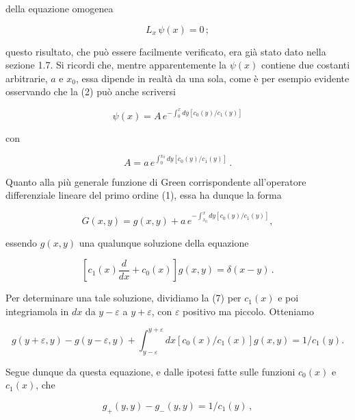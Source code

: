 \documentclass[11pt, a4paper]{book}
\numberwithin{equation}{section}
\begin{document}
della equazione omogenea

\begin{equation}
    L_x \, \psi(x) = 0 \,;
\end{equation}

questo risultato, che può essere facilmente verificato, era già stato dato nella sezione 1.7. Si ricordi che, mentre apparentemente la $\psi(x)$ contiene due costanti arbitrarie, $a$ e $x_0$, essa dipende in realtà da una sola, come è per esempio evidente osservando che la (2) può anche scriversi

\begin{equation}
    \psi(x) = A \, e^{\displaystyle -\int_0^x dy \left[ c_0(y)/c_1(y) \right]}
\end{equation}

con

\begin{equation}
    A = a \, e^{\displaystyle \int_0^{x_0} dy \left[ c_0(y)/c_1(y) \right]} \,.
\end{equation}

Quanto alla più generale funzione di Green corrispondente all'operatore differenziale lineare del primo ordine (1), essa ha dunque la forma

\begin{equation}
    G(x,y) = g(x,y) + a \, e^{\displaystyle -\int_{x_0}^{x} dy \left[ c_0(y)/c_1(y) \right]},
\end{equation}

essendo $g(x,y)$ una qualunque soluzione della equazione

\begin{equation}
    \left[ c_1(x) \frac{d}{dx} + c_0(x) \right] g(x,y) = \delta(x-y) \,.
\end{equation}

Per determinare una tale soluzione, dividiamo la (7) per $c_1(x)$ e poi integriamola in $dx$ da $y-\varepsilon$ a $y+\varepsilon$, con $\varepsilon$ positivo ma piccolo. Otteniamo

\begin{equation}
    g(y+\varepsilon,y) - g(y-\varepsilon,y) + \int_{y-\varepsilon}^{y+\varepsilon} dx \left[ c_0(x)/c_1(x) \right] g(x,y) = 1/c_1(y).
\end{equation}

Segue dunque da questa equazione, e dalle ipotesi fatte sulle funzioni $c_0(x)$ e $c_1(x)$, che

\begin{equation}
    g_+(y,y) - g_-(y,y) = 1/c_1(y) \,,
\end{equation}
\end{document}
